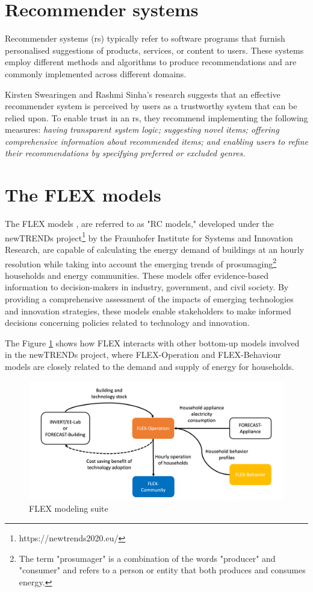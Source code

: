 \section{Recommender systems}

Recommender systems (\gls{rs}) typically refer to software programs that furnish personalised suggestions of products, services, or content to users. 
These systems employ different methods and algorithms to produce recommendations and are commonly implemented across different domains. 

Kirsten Swearingen and Rashmi Sinha's research \cite{rs} suggests that an effective recommender system is perceived by users as a trustworthy system that can be relied upon. 
To enable trust in an \gls{rs}, they recommend implementing the following measures:
\emph{
  having transparent system logic; 
  suggesting novel items; 
  offering comprehensive information about recommended items; 
  and enabling users to refine their recommendations by specifying preferred or excluded genres.
}

\section{The FLEX models}

The FLEX models \cite{newtrends}, are referred to as "RC models," developed under the newTRENDs project\footnote{https://newtrends2020.eu/} by the Fraunhofer Institute for Systems and Innovation Research, 
are capable of calculating the energy demand of buildings at an hourly resolution while taking into account the emerging trends of prosumaging\footnote{The term "prosumager" is a combination of the words "producer" and "consumer" and refers to a person or entity that both produces and consumes energy.} households and energy communities. 
These models offer evidence-based information to decision-makers in industry, government, and civil society. 
By providing a comprehensive assessment of the impacts of emerging technologies and innovation strategies, these models enable stakeholders to make informed decisions concerning policies related to technology and innovation. 

The Figure \ref{fig:flex} shows how FLEX interacts with other bottom-up models involved in the newTRENDs project,
where FLEX-Operation and FLEX-Behaviour models are closely related to the demand and supply of energy for households. 
\begin{figure}[h]
  \centering
  \includegraphics[width=\textwidth]{Images/flex.png}
  \caption{FLEX modeling suite}
  \label{fig:flex}
\end{figure}

